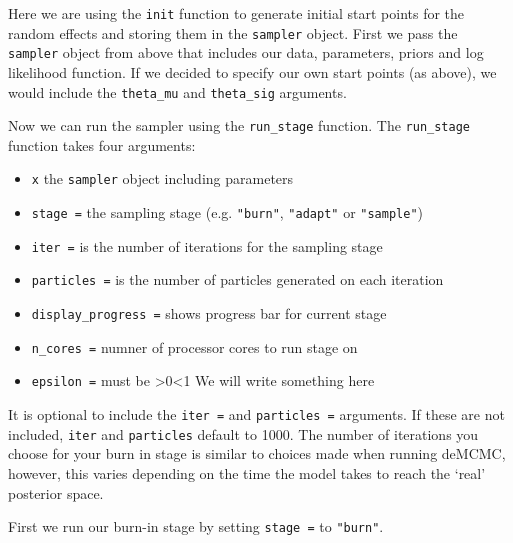 \documentclass[]{book}
\newenvironment{Shaded}{\begin{snugshade}}{\end{snugshade}}
\newcommand{\DataTypeTok}[1]{\textcolor[rgb]{0.13,0.29,0.53}{#1}}
\newcommand{\KeywordTok}[1]{\textcolor[rgb]{0.13,0.29,0.53}{\textbf{#1}}}
\newcommand{\NormalTok}[1]{#1}
\newcommand{\OperatorTok}[1]{\textcolor[rgb]{0.81,0.36,0.00}{\textbf{#1}}}
\newcommand{\StringTok}[1]{\textcolor[rgb]{0.31,0.60,0.02}{#1}}
\providecommand{\tightlist}{%
  \setlength{\itemsep}{0pt}\setlength{\parskip}{0pt}}
\begin{document}
\begin{Shaded}
\end{Shaded}

Here we are using the \texttt{init} function to generate initial start points for the random effects and storing them in the \texttt{sampler} object. First we pass the \texttt{sampler} object from above that includes our data, parameters, priors and log likelihood function. If we decided to specify our own start points (as above), we would include the \texttt{theta\_mu} and \texttt{theta\_sig} arguments.

Now we can run the sampler using the \texttt{run\_stage} function. The \texttt{run\_stage} function takes four arguments:

\begin{itemize}
\tightlist
\item
  \texttt{x} the \texttt{sampler} object including parameters
\item
  \texttt{stage\ =} the sampling stage (e.g. \texttt{"burn"}, \texttt{"adapt"} or \texttt{"sample"})
\item
  \texttt{iter\ =} is the number of iterations for the sampling stage
\item
  \texttt{particles\ =} is the number of particles generated on each iteration
\item
  \texttt{display\_progress\ =} shows progress bar for current stage
\item
  \texttt{n\_cores\ =} numner of processor cores to run stage on
\item
  \texttt{epsilon\ =} must be \textgreater{}0\textless{}1 We will write something here 
\end{itemize}

It is optional to include the \texttt{iter\ =} and \texttt{particles\ =} arguments. If these are not included, \texttt{iter} and \texttt{particles} default to 1000. The number of iterations you choose for your burn in stage is similar to choices made when running deMCMC, however, this varies depending on the time the model takes to reach the `real' posterior space.

First we run our burn-in stage by setting \texttt{stage\ =} to \texttt{"burn"}.
\end{document}
